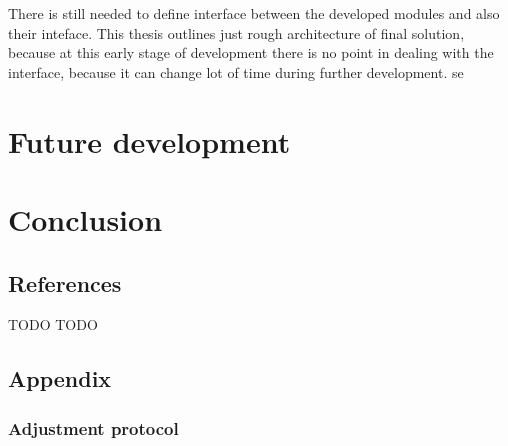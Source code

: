 \documentclass[a4paper,12pt]{report}
\begin{document}
There is still needed to define interface between the developed modules and also their inteface. 
This thesis outlines just rough architecture of final solution, because at this early stage of development 
there is no point in dealing with the interface, because it can change lot of time during further development.
se


\chapter{Future development}




\chapter{Conclusion}

\section{References}









TODO
TODO










\section{Appendix}
\subsection{Adjustment protocol}
\label{sec:adj_protocol}
\end{document}
